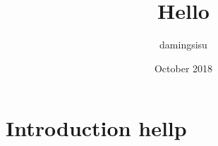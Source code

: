 \documentclass{article}
\title{Hello}
\author{damingsisu }
\date{October 2018}
\begin{document}
\maketitle

\section{Introduction hellp }
\end{document}
